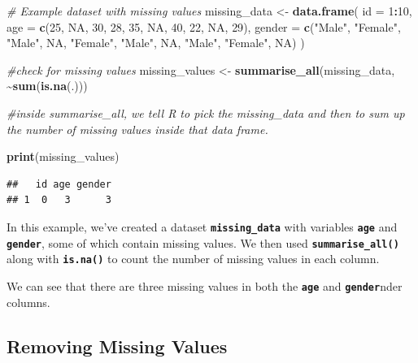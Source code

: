 \documentclass[
]{book}
\newenvironment{Shaded}{\begin{snugshade}}{\end{snugshade}}
\newcommand{\AttributeTok}[1]{\textcolor[rgb]{0.13,0.29,0.53}{#1}}
\newcommand{\CommentTok}[1]{\textcolor[rgb]{0.56,0.35,0.01}{\textit{#1}}}
\newcommand{\ConstantTok}[1]{\textcolor[rgb]{0.56,0.35,0.01}{#1}}
\newcommand{\DecValTok}[1]{\textcolor[rgb]{0.00,0.00,0.81}{#1}}
\newcommand{\FunctionTok}[1]{\textcolor[rgb]{0.13,0.29,0.53}{\textbf{#1}}}
\newcommand{\NormalTok}[1]{#1}
\newcommand{\OtherTok}[1]{\textcolor[rgb]{0.56,0.35,0.01}{#1}}
\newcommand{\SpecialCharTok}[1]{\textcolor[rgb]{0.81,0.36,0.00}{\textbf{#1}}}
\newcommand{\StringTok}[1]{\textcolor[rgb]{0.31,0.60,0.02}{#1}}
\begin{document}
\begin{Shaded}
\begin{Highlighting}[]
\CommentTok{\# Example dataset with missing values}
\NormalTok{missing\_data }\OtherTok{\textless{}{-}} \FunctionTok{data.frame}\NormalTok{(}
  \AttributeTok{id =} \DecValTok{1}\SpecialCharTok{:}\DecValTok{10}\NormalTok{,}
  \AttributeTok{age =} \FunctionTok{c}\NormalTok{(}\DecValTok{25}\NormalTok{, }\ConstantTok{NA}\NormalTok{, }\DecValTok{30}\NormalTok{, }\DecValTok{28}\NormalTok{, }\DecValTok{35}\NormalTok{, }\ConstantTok{NA}\NormalTok{, }\DecValTok{40}\NormalTok{, }\DecValTok{22}\NormalTok{, }\ConstantTok{NA}\NormalTok{, }\DecValTok{29}\NormalTok{),}
  \AttributeTok{gender =} \FunctionTok{c}\NormalTok{(}\StringTok{"Male"}\NormalTok{, }\StringTok{"Female"}\NormalTok{, }\StringTok{"Male"}\NormalTok{, }\ConstantTok{NA}\NormalTok{, }\StringTok{"Female"}\NormalTok{, }\StringTok{"Male"}\NormalTok{, }\ConstantTok{NA}\NormalTok{, }\StringTok{"Male"}\NormalTok{, }\StringTok{"Female"}\NormalTok{, }\ConstantTok{NA}\NormalTok{)}
\NormalTok{)}

\CommentTok{\#check for missing values}
\NormalTok{missing\_values }\OtherTok{\textless{}{-}} \FunctionTok{summarise\_all}\NormalTok{(missing\_data, }\SpecialCharTok{\textasciitilde{}}\FunctionTok{sum}\NormalTok{(}\FunctionTok{is.na}\NormalTok{(.)))}

\CommentTok{\#inside summarise\_all, we tell R to pick the missing\_data and then to sum up the number of missing values inside that data frame. }

\FunctionTok{print}\NormalTok{(missing\_values)}
\end{Highlighting}
\end{Shaded}

\begin{verbatim}
##   id age gender
## 1  0   3      3
\end{verbatim}

In this example, we've created a dataset \textbf{\texttt{missing\_data}} with variables \textbf{\texttt{age}} and \textbf{\texttt{gender}}, some of which contain missing values. We then used \textbf{\texttt{summarise\_all()}} along with \textbf{\texttt{is.na()}} to count the number of missing values in each column.

We can see that there are three missing values in both the \textbf{\texttt{age}} and \textbf{\texttt{gender}}nder columns.

\subsection{Removing Missing Values}\label{removing-missing-values}
\end{document}
